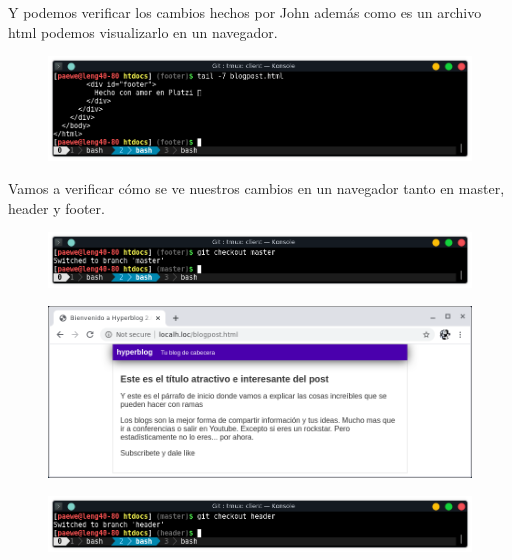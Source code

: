 \documentclass{article}
\begin{document}
Y podemos verificar los cambios hechos por John además como es un archivo html
podemos visualizarlo en un navegador.

\newpage

\begin{figure}[h!]
  \centering
  \includegraphics[scale=0.75]{./Pictures/288_footer.png}
\end{figure}

Vamos a verificar cómo se ve nuestros cambios en un navegador tanto en master,
header y footer.

\begin{figure}[h!]
  \centering
  \includegraphics[scale=0.75]{./Pictures/289_ch_master.png}
\end{figure}

\begin{figure}[h!]
  \centering
  \includegraphics[scale=0.75]{./Pictures/290_web_master.png}
\end{figure}

\begin{figure}[h!]
  \centering
  \includegraphics[scale=0.75]{./Pictures/291_ch_header.png}
\end{figure}
\end{document}
